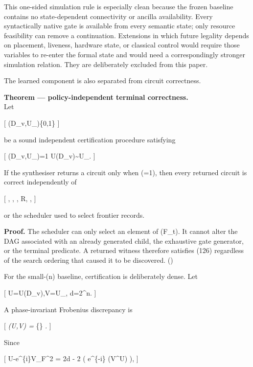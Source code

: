 \documentclass[
]{article}
\begin{document}
This one-sided simulation rule is especially clean because the frozen
baseline contains no state-dependent connectivity or ancilla
availability. Every syntactically native gate is available from every
semantic state; only resource feasibility can remove a continuation.
Extensions in which future legality depends on placement, liveness,
hardware state, or classical control would require those variables to
re-enter the formal state and would need a correspondingly stronger
simulation relation. They are deliberately excluded from this paper.

The learned component is also separated from circuit correctness.

\textbf{Theorem --- policy-independent terminal correctness.}\\
Let

{[} (D\_v,U\_\star)\in\{0,1\} {]}

be a sound independent certification procedure satisfying

{[} (D\_v,U\_\star)=1 \Longrightarrow
U(D\_v)\sim U\_\star.  {]}

If the synthesiser returns a circuit only when (=1),
then every returned circuit is correct independently of

{[} \boldsymbol\theta, \quad \varepsilon, \quad \alpha, \quad R, \quad
\boldsymbol\varphi, {]}

or the scheduler used to select frontier records.

\textbf{Proof.} The scheduler can only select an element of
(\mathcal F\_t). It cannot alter the DAG associated with an already
generated child, the exhaustive gate generator, or the terminal
predicate. A returned witness therefore satisfies (126) regardless of
the search ordering that caused it to be discovered. (\square)

For the small-(n) baseline, certification is deliberately dense. Let

{[} U=U(D\_v),\qquad V=U\_\star, \qquad d=2\^{}n. {]}

A phase-invariant Frobenius discrepancy is

{[} \Delta\emph{\phi(U,V) = \min}\{\phi\} .  {]}

Since

{[} \textbar U-e\^{}\{i\phi\}V\textbar\_F\^{}2 = 2d - 2
\left( e\^{}\{-i\phi\} (V\^{}\dagger U) \right),
 {]}
\end{document}
